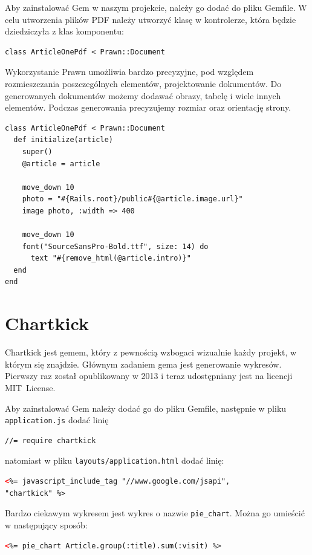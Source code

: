 \documentclass[openright]{xmgr}
\begin{document}
Aby zainstalować Gem w naszym projekcie, należy go dodać do pliku Gemfile. W celu utworzenia plików PDF należy utworzyć klasę w kontrolerze, która będzie dziedziczyła z klas komponentu:
\begin{lstlisting}[language=ruby2, caption={Deklaracja klasy generującej plik PDF}]
class ArticleOnePdf < Prawn::Document
\end{lstlisting}
Wykorzystanie Prawn umożliwia bardzo precyzyjne, pod względem rozmieszczania poszczególnych elementów, projektowanie dokumentów. Do generowanych dokumentów możemy dodawać obrazy, tabelę  i wiele innych elementów. Podczas generowania precyzujemy rozmiar oraz orientację strony. 
\begin{lstlisting}[language=ruby2, caption={Kod generujacy dokment zawierający ilustrację i wstęp do artykułu}]
class ArticleOnePdf < Prawn::Document
  def initialize(article)
    super()
    @article = article    

    move_down 10
    photo = "#{Rails.root}/public#{@article.image.url}"
    image photo, :width => 400

    move_down 10
    font("SourceSansPro-Bold.ttf", size: 14) do
      text "#{remove_html(@article.intro)}"
  end
end
\end{lstlisting}

\newpage

\section{Chartkick}
Chartkick \cite{chartkick} jest gemem, który z pewnością wzbogaci wizualnie każdy projekt, w którym się znajdzie. Głównym zadaniem gema jest generowanie wykresów. Pierwszy raz został opublikowany w 2013 i teraz udostępniany jest na licencji \mbox{MIT License. }

Aby zainstalować Gem należy dodać go do pliku Gemfile, następnie w pliku \texttt{application.js} dodać linię 
\begin{lstlisting}[language=ruby2, caption={Framgent zawartości pliku application.js}]
//= require chartkick
\end{lstlisting}
natomiast w pliku \texttt{layouts/application.html} dodać linię:
\begin{lstlisting}[language=html, caption={Framgent zawartości pliku application.html.rb}]
<%= javascript_include_tag "//www.google.com/jsapi", 
"chartkick" %>
\end{lstlisting}

Bardzo ciekawym wykresem jest wykres o nazwie \texttt{pie\_chart}. Można go umieścić w następujący sposób:
\begin{lstlisting}[language=html, caption={Kod generujący wykres kołowy}]
<%= pie_chart Article.group(:title).sum(:visit) %>
\end{lstlisting}
\end{document}
